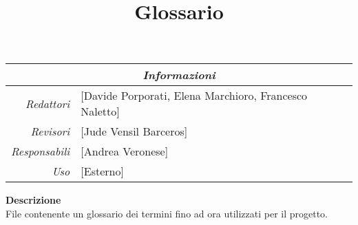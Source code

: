 \documentclass[12pt]{article}
\begin{document}
\graphicspath{ {../templates/img/} }

\title{Glossario}

\firstPage

\maketitle

\begin{center}
    \begin{tabular}{r | l}
		\multicolumn{2}{c}{\textit{Informazioni}}\\
		\hline
		
			\textit{Redattori} &
			[Davide Porporati, Elena Marchioro, Francesco Naletto]\makecell{}\\

			\textit{Revisori} &
			[Jude Vensil Barceros]\makecell{}\\
			\textit{Responsabili} &
			[Andrea Veronese]\makecell{}\\
		      \textit{Uso} & 
                [Esterno]\makecell{}\\
    \end{tabular}
\end{center}

\begin{center}
    \textbf{Descrizione}\\
    File contenente un glossario dei termini fino ad ora utilizzati per il progetto.
\end{center}

\pagebreak

\tableofcontents
\pagebreak

\printindex 

\makeversioni
\end{document}
